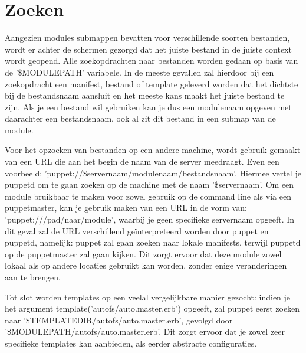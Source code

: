 \section{Zoeken}
Aangezien modules submappen bevatten voor verschillende soorten bestanden, wordt er achter de schermen gezorgd dat het juiste bestand in de juiste context wordt geopend. Alle zoekopdrachten naar bestanden worden gedaan op basis van de '\$MODULEPATH' variabele. In de meeste gevallen zal hierdoor bij een zoekopdracht een manifest, bestand of template geleverd worden dat het dichtste bij de bestandsnaam aansluit en het meeste kans maakt het juiste bestand te zijn. Als je een bestand wil gebruiken kan je dus een modulenaam opgeven met daarachter een bestandsnaam, ook al zit dit bestand in een submap van de module.

Voor het opzoeken van bestanden op een andere machine, wordt gebruik gemaakt van een URL die aan het begin de naam van de server meedraagt. Even een voorbeeld: 'puppet://\$servernaam/modulenaam/bestandsnaam'. Hiermee vertel je puppetd om te gaan zoeken op de machine met de naam '\$servernaam'. Om een module bruikbaar te maken voor zowel gebruik op de command line als via een puppetmaster, kan je gebruik maken van een URL in de vorm van: 'puppet:///pad/naar/module', waarbij je geen specifieke servernaam opgeeft. In dit geval zal de URL verschillend ge\"interpreteerd worden door puppet en puppetd, namelijk: puppet zal gaan zoeken naar lokale manifests, terwijl puppetd op de puppetmaster zal gaan kijken. Dit zorgt ervoor dat deze module zowel lokaal als op andere locaties gebruikt kan worden, zonder enige veranderingen aan te brengen.

Tot slot worden templates op een veelal vergelijkbare manier gezocht: indien je het argument template('autofs/auto.master.erb') opgeeft, zal puppet eerst zoeken naar '\$TEMPLATEDIR/autofs/auto.master.erb', gevolgd door '\$MODULEPATH/autofs/auto.master.erb'. Dit zorgt ervoor dat je zowel zeer specifieke templates kan aanbieden, als eerder abstracte configuraties.

